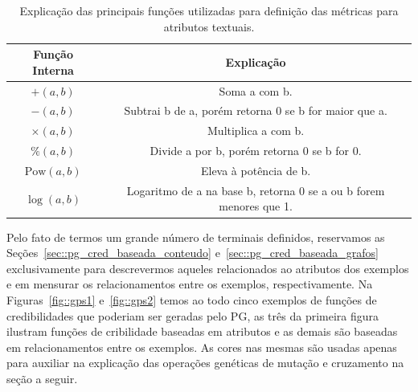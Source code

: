 \begin{table}[ht*]
\centering
\begin{tabular}{|c|c|}
\toprule
    \textbf{Função Interna} & \textbf{Explicação} \\
\midrule
    $+(a,b)$           & Soma a com b. \tabularnewline \hline
    $-(a,b)$           & Subtrai b de a, porém retorna 0 se b for maior que a.\tabularnewline \hline
    $\times(a,b) $     & Multiplica a com b. \tabularnewline \hline
    $\%(a,b)$          & Divide a por b, porém retorna 0 se b for 0. \tabularnewline \hline
    $\text{Pow}(a,b)$  & Eleva à potência de b. \tabularnewline \hline 
    $\log(a,b) $       & Logaritmo de a na base b, retorna 0 se a ou b forem menores que 1. \tabularnewline
\bottomrule
\end{tabular}
\caption{Explicação das principais funções utilizadas para definição das métricas para atributos textuais.}
\label{table::funcoespg}
\end{table}

Pelo fato de termos um grande número de terminais definidos, reservamos as Seções~\ref{sec::pg_cred_baseada_conteudo} e~\ref{sec::pg_cred_baseada_grafos} exclusivamente para descrevermos aqueles relacionados ao atributos dos exemplos e em mensurar os relacionamentos entre os exemplos, respectivamente. Na Figuras~\ref{fig::gps1} e~\ref{fig::gps2} temos ao todo cinco exemplos de funções de credibilidades que poderiam ser geradas pelo \textsc{PG}, as três da primeira figura ilustram funções de cribilidade baseadas em atributos e as demais são baseadas em relacionamentos entre os exemplos. As cores nas mesmas são usadas apenas para auxiliar na explicação das operações genéticas de mutação e cruzamento na seção a seguir.

